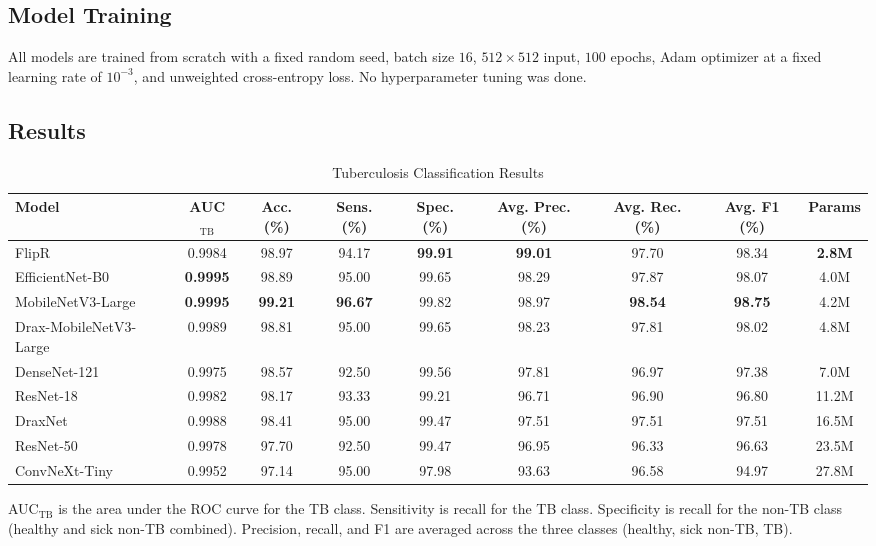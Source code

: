 \documentclass[conference, letterpaper]{IEEEtran}
\begin{document}
\subsection{Model Training}

All models are trained from scratch with a fixed random seed, batch size $16$, $512\times512$ input, $100$ epochs, Adam optimizer at a fixed learning rate of $10^{-3}$, and unweighted cross-entropy loss. No hyperparameter tuning was done.

\subsection{Results}

\begin{table}[!t]
\renewcommand{\arraystretch}{1.2}
\centering
\begin{threeparttable}
\caption{Tuberculosis Classification Results}
\label{tab:classification_results}
\small
\begin{tabular}{@{}l c c c c c c c c@{}}
\toprule
\textbf{Model} & \textbf{AUC$_{\text{TB}}$} & \textbf{Acc. (\%)} & \textbf{Sens. (\%)} & \textbf{Spec. (\%)} & \textbf{Avg. Prec. (\%)} & \textbf{Avg. Rec. (\%)} & \textbf{Avg. F1 (\%)} & \textbf{Params} \\
\midrule
FlipR                  & 0.9984 & 98.97 & 94.17 & \textbf{99.91} & \textbf{99.01} & 97.70 & 98.34 & \textbf{2.8M} \\
EfficientNet-B0        & \textbf{0.9995} & 98.89 & 95.00 & 99.65 & 98.29 & 97.87 & 98.07 & 4.0M \\
MobileNetV3-Large      & \textbf{0.9995} & \textbf{99.21} & \textbf{96.67} & 99.82 & 98.97 & \textbf{98.54} & \textbf{98.75} & 4.2M \\
Drax-MobileNetV3-Large & 0.9989 & 98.81 & 95.00 & 99.65 & 98.23 & 97.81 & 98.02 & 4.8M \\
DenseNet-121           & 0.9975 & 98.57 & 92.50 & 99.56 & 97.81 & 96.97 & 97.38 & 7.0M \\
ResNet-18              & 0.9982 & 98.17 & 93.33 & 99.21 & 96.71 & 96.90 & 96.80 & 11.2M \\
DraxNet                & 0.9988 & 98.41 & 95.00 & 99.47 & 97.51 & 97.51 & 97.51 & 16.5M \\
ResNet-50              & 0.9978 & 97.70 & 92.50 & 99.47 & 96.95 & 96.33 & 96.63 & 23.5M \\
ConvNeXt-Tiny          & 0.9952 & 97.14 & 95.00 & 97.98 & 93.63 & 96.58 & 94.97 & 27.8M \\
\bottomrule
\end{tabular}
\begin{tablenotes}[flushleft]
\footnotesize
\item AUC$_{\text{TB}}$ is the area under the ROC curve for the TB class. Sensitivity is recall for the TB class. Specificity is recall for the non-TB class (healthy and sick non-TB combined). Precision, recall, and F1 are averaged across the three classes (healthy, sick non-TB, TB).
\end{tablenotes}
\end{threeparttable}
\end{table}
\end{document}
